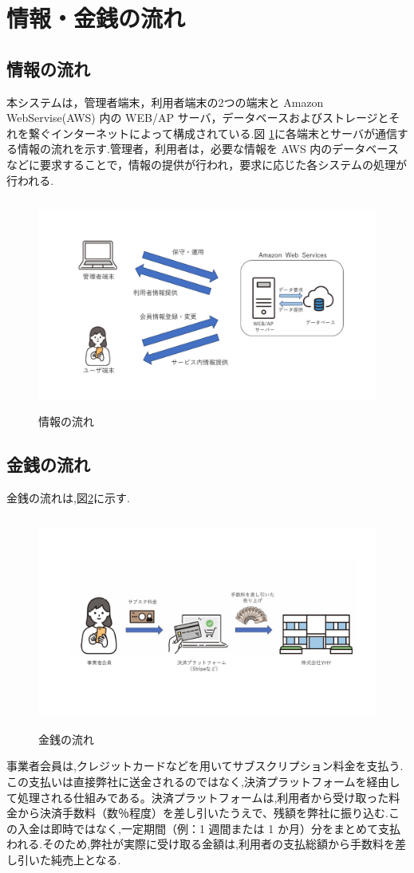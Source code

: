 \section{情報・金銭の流れ}
\subsection{情報の流れ}
本システムは，管理者端末，利用者端末の2つの端末と Amazon WebServise(AWS) 内の WEB/AP サーバ，データベースおよびストレージとそれを繋ぐインターネットによって構成されている.図 \ref{fig:Q7}に各端末とサーバが通信する情報の流れを示す.管理者，利用者は，必要な情報を AWS 内のデータベースなどに要求することで，情報の提供が行われ，要求に応じた各システムの処理が行われる.

\begin{figure}[H]
        \centering
        \includegraphics[width=12cm, height=7cm]{pictures/4-1_info.jpg}
        \caption{情報の流れ}
        \label{fig:Q7}
\end{figure}



\subsection{金銭の流れ}
金銭の流れは,図\ref{fig:Q8}に示す.

\begin{figure}[H]
        \centering
        \includegraphics[width=12cm, height=7cm]{pictures/4-2_money.jpg}
        \caption{金銭の流れ}
        \label{fig:Q8}
\end{figure}

事業者会員は,クレジットカードなどを用いてサブスクリプション料金を支払う.この支払いは直接弊社に送金されるのではなく,決済プラットフォームを経由して処理される仕組みである。決済プラットフォームは,利用者から受け取った料金から決済手数料（数％程度）を差し引いたうえで、残額を弊社に振り込む.この入金は即時ではなく,一定期間（例：1 週間または 1 か月）分をまとめて支払われる.そのため,弊社が実際に受け取る金額は,利用者の支払総額から手数料を差し引いた純売上となる.







